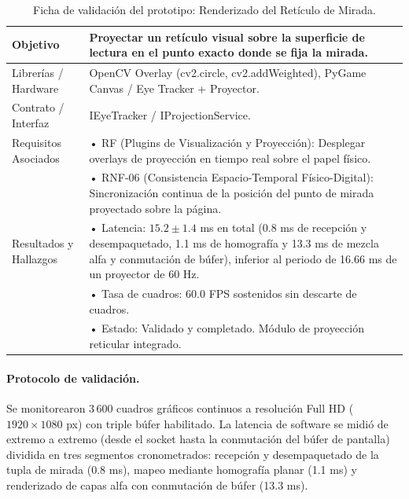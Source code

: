 \begin{table}[H]
    \centering
    \caption{Ficha de validación del prototipo: Renderizado del Retículo de Mirada.}
    \label{tab:ficha_f13}
    \begin{tabular}{L{3.2cm} L{11.0cm}}
        \toprule
        Objetivo & Proyectar un retículo visual sobre la superficie de lectura en el punto exacto donde se fija la mirada. \\ \midrule
        Librerías / Hardware & OpenCV Overlay (cv2.circle, cv2.addWeighted), PyGame Canvas / Eye Tracker + Proyector. \\ \midrule
        Contrato / Interfaz & IEyeTracker / IProjectionService. \\ \midrule
        Requisitos Asociados &
        • RF (Plugins de Visualización y Proyección): Desplegar overlays de proyección en tiempo real sobre el papel físico. \vspace{0.1cm} \\
        & • RNF-06 (Consistencia Espacio-Temporal Físico-Digital): Sincronización continua de la posición del punto de mirada proyectado sobre la página. \\ \midrule
        Resultados y Hallazgos &
        • Latencia: $15.2 \pm 1.4$ ms en total (0.8 ms de recepción y desempaquetado, 1.1 ms de homografía y 13.3 ms de mezcla alfa y conmutación de búfer), inferior al periodo de 16.66 ms de un proyector de 60 Hz. \vspace{0.1cm} \\
        & • Tasa de cuadros: 60.0 FPS sostenidos sin descarte de cuadros. \vspace{0.1cm} \\
        & • Estado: Validado y completado. Módulo de proyección reticular integrado. \\ \bottomrule
    \end{tabular}
\end{table}
 
\paragraph{Protocolo de validación.} Se monitorearon 3\,600 cuadros gráficos continuos a resolución Full HD ($1920 \times 1080$ px) con triple búfer habilitado. La latencia de software se midió de extremo a extremo (desde el socket hasta la conmutación del búfer de pantalla) dividida en tres segmentos cronometrados: recepción y desempaquetado de la tupla de mirada (0.8 ms), mapeo mediante homografía planar (1.1 ms) y renderizado de capas alfa con conmutación de búfer (13.3 ms).
 
